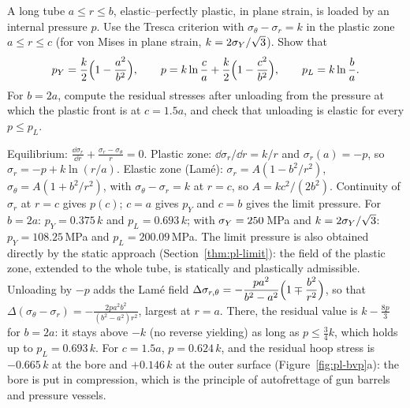 \label{exo:pl-cyl}
%
A long tube $a\le r\le b$, elastic--perfectly plastic, in plane strain, is
loaded by an internal pressure $p$. Use the Tresca criterion with
$\sigma_\theta-\sigma_r=k$ in the plastic zone $a\le r\le c$ (for von Mises in
plane strain, $k=2\sigma_{Y}/\sqrt3$). Show that
\[
  p_Y=\frac k2\Bigl(1-\frac{a^2}{b^2}\Bigr),\qquad
  p=k\ln\frac ca+\frac k2\Bigl(1-\frac{c^2}{b^2}\Bigr),\qquad
  p_L=k\ln\frac ba .
\]
For $b=2a$, compute the residual stresses after unloading from the pressure
at which the plastic front is at $c=1.5a$, and check that unloading is
elastic for every $p\le p_L$.
\begin{solution}
Equilibrium: $\displaystyle \frac{\dd\sigma_r}{\dd r}+\frac{\sigma_r-\sigma_\theta}{r}=0$.
Plastic zone: $\dd\sigma_r/\dd r=k/r$ and $\sigma_r(a)=-p$, so
$\sigma_r=-p+k\ln(r/a)$. Elastic zone (Lam\'e): $\sigma_r=A(1-b^2/r^2)$,
$\sigma_\theta=A(1+b^2/r^2)$, with $\sigma_\theta-\sigma_r=k$ at $r=c$, so
$A=kc^2/(2b^2)$. Continuity of $\sigma_r$ at $r=c$ gives $p(c)$; $c=a$ gives
$p_Y$ and $c=b$ gives the limit pressure. For $b=2a$: $p_Y=0.375\,k$ and
$p_L=0.693\,k$; with $\sigma_{Y}=250$\,MPa and $k=2\sigma_{Y}/\sqrt3$: $p_Y=108.25$\,MPa and
$p_L=200.09$\,MPa. The limit pressure is also obtained directly by the static
approach (Section~\ref{thm:pl-limit}): the field of the plastic zone,
extended to the whole tube, is statically and plastically admissible.
Unloading by $-p$ adds the Lam\'e field
$\displaystyle \Delta\sigma_{r,\theta}=-\frac{pa^2}{b^2-a^2}\Bigl(1\mp\frac{b^2}{r^2}\Bigr)$,
so that $\displaystyle \Delta(\sigma_\theta-\sigma_r)=-\frac{2pa^2b^2}{(b^2-a^2)r^2}$, largest at
$r=a$. There, the residual value is $\displaystyle k-\frac{8p}{3}$ for $b=2a$: it
stays above $-k$ (no reverse yielding) as long as $p\le\tfrac34k$, which holds
up to $p_L=0.693\,k$. For $c=1.5a$, $p=0.624\,k$, and the residual hoop
stress is $-0.665\,k$ at the bore and $+0.146\,k$ at the outer surface
(Figure~\ref{fig:pl-bvp}a): the bore is put in compression, which is the
principle of autofrettage of gun barrels and pressure vessels.
\end{solution}

